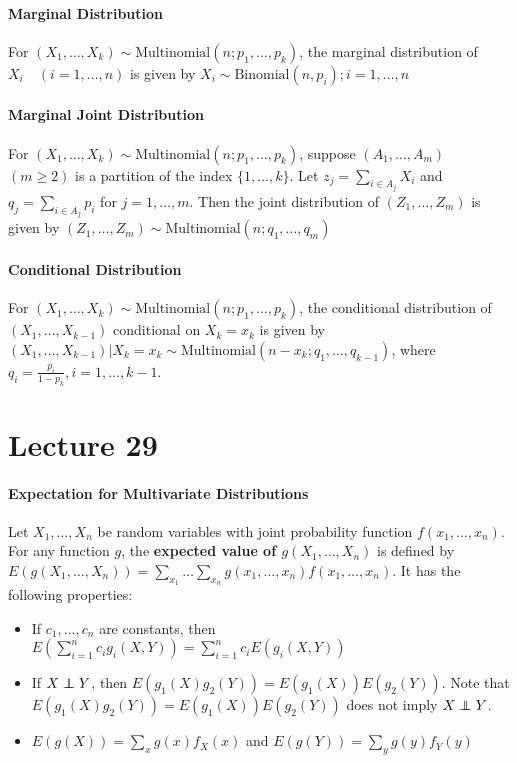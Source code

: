 \documentclass[10pt,letter]{article}
\newcommand\independent{\protect\mathpalette{\protect\independenT}{\perp}}
\def\independenT#1#2{\mathrel{\rlap{$#1#2$}\mkern2mu{#1#2}}}
\begin{document}
\paragraph{Marginal Distribution}
For $(X_1,\ldots,X_k)\sim \text{Multinomial}(n;p_1,\ldots,p_k)$, the marginal distribution of $X_i\quad(i=1,\ldots,n)$ is given by $X_i\sim\text{Binomial}(n,p_i);i=1,\ldots,n$ 
\paragraph{Marginal Joint Distribution}
For $(X_1,\ldots,X_k)\sim\text{Multinomial}(n;p_1,\ldots,p_k)$, suppose $(A_1,\ldots,A_m)$ $(m\geq2)$ is a partition of the index $\{1,\ldots,k\}$. Let $z_j=\sum_{i\in A_j}X_i$ and $q_j=\sum_{i\in A_j}p_i$ for $j=1,\ldots,m$. Then the joint distribution of $(Z_1,\ldots,Z_m)$ is given by $(Z_1,\ldots,Z_m)\sim \text{Multinomial}(n;q_1,\ldots,q_m)$

\paragraph{Conditional Distribution}
For $(X_1,\ldots,X_k)\sim\text{Multinomial}(n;p_1,\ldots,p_k)$, the conditional distribution of $(X_1,\ldots,X_{k-1})$ conditional on $X_k=x_k$ is given by $(X_1,\ldots,X_{k-1})|X_k=x_k\sim\text{Multinomial}(n-x_k;q_1,\ldots,q_{k-1})$, where $q_i=\frac{p_i}{1-p_k},i=1,\ldots,k-1$. 


\section*{Lecture 29}
\paragraph{Expectation for Multivariate Distributions}
Let $X_1,\ldots,X_n$ be random variables with joint probability function $f(x_1,\ldots,x_n)$. For any function $g$, the \textbf{expected value of $g(X_1,\ldots,X_n)$} is defined by $E(g(X_1,\ldots,X_n))=\sum_{x_1}\ldots\sum_{x_n}g(x_1,\ldots,x_n)f(x_1,\ldots,x_n)$. It has the following properties: 
\begin{itemize}
    \item If $c_1,\ldots,c_n$ are constants, then $E\left(\sum_{i=1}^n c_ig_i(X,Y)\right)=\sum_{i=1}^nc_iE(g_i(X,Y))$ 
    \item If $X\independent Y$, then $E(g_1(X)g_2(Y))=E(g_1(X))E(g_2(Y))$. Note that $E(g_1(X)g_2(Y))=E(g_1(X))E(g_2(Y))$ does not imply $X\independent Y$.  
    \item $E(g(X))=\sum_{x}g(x)f_X(x)$ and $E(g(Y))=\sum_{y}g(y)f_Y(y)$
\end{itemize}
\end{document}
